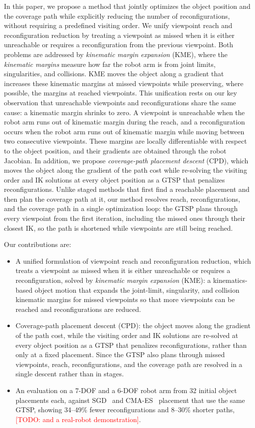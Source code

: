 \documentclass[letterpaper, journal, twoside]{IEEEtran}
\DeclareRobustCommand{\todo}[1]{\textcolor{red}{[TODO: #1]}}  %
\begin{document}
In this paper, we propose a method that jointly optimizes the object position and the coverage path while explicitly reducing the number of reconfigurations, without requiring a predefined visiting order. We unify viewpoint reach and reconfiguration reduction by treating a viewpoint as missed when it is either unreachable or requires a reconfiguration from the previous viewpoint. Both problems are addressed by \emph{kinematic margin expansion} (KME), where the \emph{kinematic margins} measure how far the robot arm is from joint limits, singularities, and collisions. KME moves the object along a gradient that increases these kinematic margins at missed viewpoints while preserving, where possible, the margins at reached viewpoints. This unification rests on our key observation that unreachable viewpoints and reconfigurations share the same cause: a kinematic margin shrinks to zero. A viewpoint is unreachable when the robot arm runs out of kinematic margin during the reach, and a reconfiguration occurs when the robot arm runs out of kinematic margin while moving between two consecutive viewpoints. These margins are locally differentiable with respect to the object position, and their gradients are obtained through the robot Jacobian. In addition, we propose \emph{coverage-path placement descent} (CPD), which moves the object along the gradient of the path cost while re-solving the visiting order and IK solutions at every object position as a GTSP that penalizes reconfigurations. Unlike staged methods that first find a reachable placement and then plan the coverage path at it, our method resolves reach, reconfigurations, and the coverage path in a single optimization loop: the GTSP plans through every viewpoint from the first iteration, including the missed ones through their closest IK, so the path is shortened while viewpoints are still being reached.

Our contributions are:
\begin{itemize}
  \item A unified formulation of viewpoint reach and reconfiguration reduction, which treats a viewpoint as missed when it is either unreachable or requires a reconfiguration, solved by \emph{kinematic margin expansion} (KME): a kinematics-based object motion that expands the joint-limit, singularity, and collision kinematic margins for missed viewpoints so that more viewpoints can be reached and reconfigurations are reduced.
  \item Coverage-path placement descent (CPD): the object moves along the gradient of the path cost, while the visiting order and IK solutions are re-solved at every object position as a GTSP that penalizes reconfigurations, rather than only at a fixed placement. Since the GTSP also plans through missed viewpoints, reach, reconfigurations, and the coverage path are resolved in a single descent rather than in stages.
  \item An evaluation on a 7-DOF and a 6-DOF robot arm from 32 initial object placements each, against SGD~\cite{mayer2026smart} and CMA-ES~\cite{hansen2016cmaes} placement that use the same GTSP, showing 34--49\% fewer reconfigurations and 8--30\% shorter paths, \todo{and a real-robot demonstration}.
\end{itemize}
\end{document}
